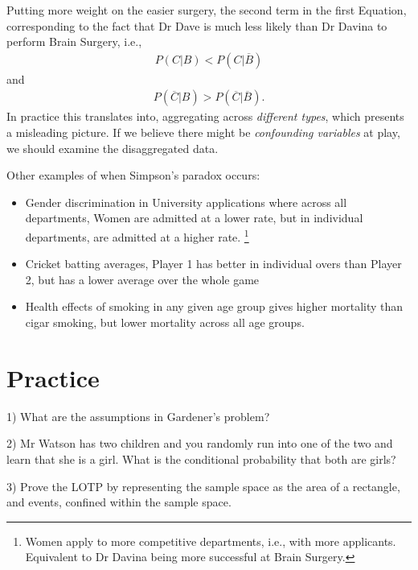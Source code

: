 Putting more weight on the easier surgery, 
the second term in the first Equation, 
corresponding to the fact that Dr Dave is much less likely than Dr Davina to perform Brain Surgery, i.e.,
\begin{align}
P\left(C|B\right) < P(C|\overline{B})
\end{align}
and
\begin{align}
P\left(\overline{C}|B\right) > P\left(\overline{C}|\overline{B} \right).
\end{align}
In practice this translates into, 
aggregating across \emph{different types},
which presents a misleading picture. 
If we believe there might be \emph{confounding variables} at play, 
we should examine the disaggregated data.

Other examples of when Simpson's paradox occurs:
\begin{itemize}
\item Gender discrimination in University applications where across all departments, 
Women are admitted at a lower rate, 
but in individual departments, 
are admitted at a higher rate.%
\footnote{Women apply to more competitive departments, 
i.e., with more applicants. 
Equivalent to Dr Davina being more successful at Brain Surgery.}
\item Cricket batting averages, 
Player 1 has better in individual overs than Player 2, 
but has a lower average over the whole game 
\item Health effects of smoking in any given age group gives higher mortality than cigar smoking, 
but lower mortality across all age groups.
\end{itemize}

\section{Practice}\label{practice}

1) What are the assumptions in Gardener's problem?

2) Mr Watson has two children and you randomly run into one of the two and learn that she is a girl. 
What is the conditional probability that both are girls?

3) Prove the LOTP by representing the sample space as the area of a rectangle, 
and events, confined within the sample space.


